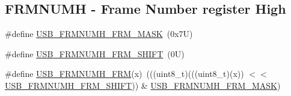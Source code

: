 \subsection*{F\+R\+M\+N\+U\+MH -\/ Frame Number register High}
\begin{DoxyCompactItemize}
\item 
\#define \mbox{\hyperlink{group___u_s_b___register___masks_ga436241a677d27ecae3001b228b51f536}{U\+S\+B\+\_\+\+F\+R\+M\+N\+U\+M\+H\+\_\+\+F\+R\+M\+\_\+\+M\+A\+SK}}~(0x7\+U)
\item 
\#define \mbox{\hyperlink{group___u_s_b___register___masks_gacb18c63687d37e245a79d7e7551823a3}{U\+S\+B\+\_\+\+F\+R\+M\+N\+U\+M\+H\+\_\+\+F\+R\+M\+\_\+\+S\+H\+I\+FT}}~(0\+U)
\item 
\#define \mbox{\hyperlink{group___u_s_b___register___masks_gafe9face0ec6a617199ad76945c034da8}{U\+S\+B\+\_\+\+F\+R\+M\+N\+U\+M\+H\+\_\+\+F\+RM}}(x)~(((uint8\+\_\+t)(((uint8\+\_\+t)(x)) $<$$<$ \mbox{\hyperlink{group___u_s_b___register___masks_gacb18c63687d37e245a79d7e7551823a3}{U\+S\+B\+\_\+\+F\+R\+M\+N\+U\+M\+H\+\_\+\+F\+R\+M\+\_\+\+S\+H\+I\+FT}})) \& \mbox{\hyperlink{group___u_s_b___register___masks_ga436241a677d27ecae3001b228b51f536}{U\+S\+B\+\_\+\+F\+R\+M\+N\+U\+M\+H\+\_\+\+F\+R\+M\+\_\+\+M\+A\+SK}})
\end{DoxyCompactItemize}
